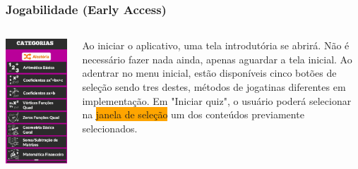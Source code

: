 \documentclass[10pt]{beamer}
\begin{document}


\begin{frame}
\frametitle{Jogabilidade (Early Access)}

\begin{columns}
	
\includegraphics[width=0.9\linewidth, height=0.9\textheight,keepaspectratio=false]{quiz_selection.jpeg} \pause	
	
	
	

Ao iniciar o aplicativo, uma tela introdutória se abrirá. Não é necessário fazer nada ainda, apenas aguardar a tela inicial. Ao adentrar no menu inicial, estão disponíveis cinco botões de seleção sendo tres destes, métodos de jogatinas diferentes em implementação.
Em "Iniciar quiz", o usuário poderá selecionar na \colorbox{orange}{janela de seleção} um dos conteúdos previamente selecionados. 


\end{columns} 
\end{frame}
\end{document}
